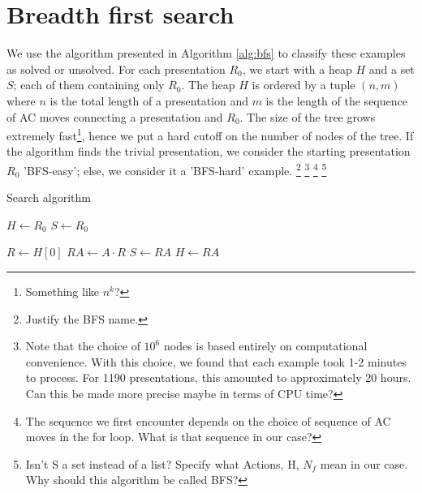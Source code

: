 
\section{Breadth first search}






We use the algorithm presented in Algorithm \autoref{alg:bfs} to classify these examples as solved or unsolved.
For each presentation $R_0$, we start with a heap $H$ and a set $S$; each of them containing only $R_0$.
The heap $H$ is ordered by a tuple $(n, m)$ where $n$ is the total length of a presentation and $m$ is the length of the sequence of AC moves connecting a presentation and $R_0$.
The size of the tree grows extremely fast\footnote{Something like $n^k$?}, hence we put a hard cutoff on the number of nodes of the tree.
If the algorithm finds the trivial presentation, we consider the starting presentation $R_0$ 'BFS-easy'; else, we consider it a 'BFS-hard' example.
\footnote{Justify the BFS name.}
\footnote{Note that the choice of $10^6$ nodes is based entirely on computational convenience.
With this choice, we found that each example took 1-2 minutes to process.
For 1190 presentations, this amounted to approximately 20 hours.
Can this be made more precise maybe in terms of CPU time?}
\footnote{The sequence we first encounter depends on the choice of sequence of AC moves in the for loop.
What is that sequence in our case?}
\footnote{Isn't S a set instead of a list? Specify what Actions, H, $N_f$ mean in our case.
Why should this algorithm be called BFS?}

\begin{algorithm}
	\caption{Search algorithm}\label{alg:bfs}
	\begin{algorithmic}
		\State $H \gets R_0$ 
		\State $S \gets R_0$ 

		 
		\State $R \gets H[0]$ 
		\State $RA \gets A \cdot R$ 
		\State $S \gets RA$
		\State $H \gets RA$ 

		\EndIf
		\EndFor
		\EndWhile
	\end{algorithmic}
\end{algorithm}

